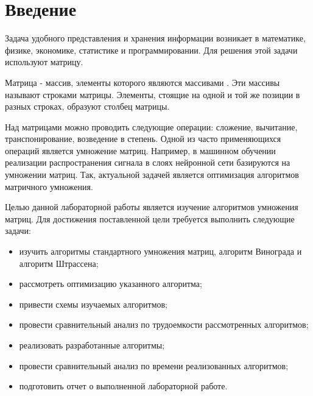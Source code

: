 \chapter*{Введение}

Задача удобного представления и хранения информации возникает в математике, физике, экономике, статистике и программировании. Для решения этой задачи используют матрицу.

Матрица - массив, элементы которого являются массивами \cite{virt}. Эти массивы называют строками матрицы. Элементы, стоящие на одной и той же позиции в разных строках, образуют столбец матрицы.

Над матрицами можно проводить следующие операции: сложение, вычитание, транспонирование, возведение в степень. Одной из часто применяющихся операций является умножение матриц. Например, в машинном обучении реализации распространения сигнала в слоях нейронной сети базируются на умножении матриц. Так, актуальной задачей является оптимизация алгоритмов матричного умножения.

Целью данной лабораторной работы является изучение алгоритмов умножения матриц. Для достижения поставленной цели требуется выполнить следующие задачи:

\begin{itemize}
	\item изучить алгоритмы стандартного умножения матриц, алгоритм Винограда и алгоритм Штрассена;
	\item рассмотреть оптимизацию указанного алгоритма;
	\item привести схемы изучаемых алгоритмов;
	\item провести сравнительный анализ по трудоемкости рассмотренных алгоритмов;
	\item реализовать разработанные алгоритмы;
	\item провести сравнительный анализ по времени реализованных алгоритмов;
	\item подготовить отчет о выполненной лабораторной работе.
\end{itemize}